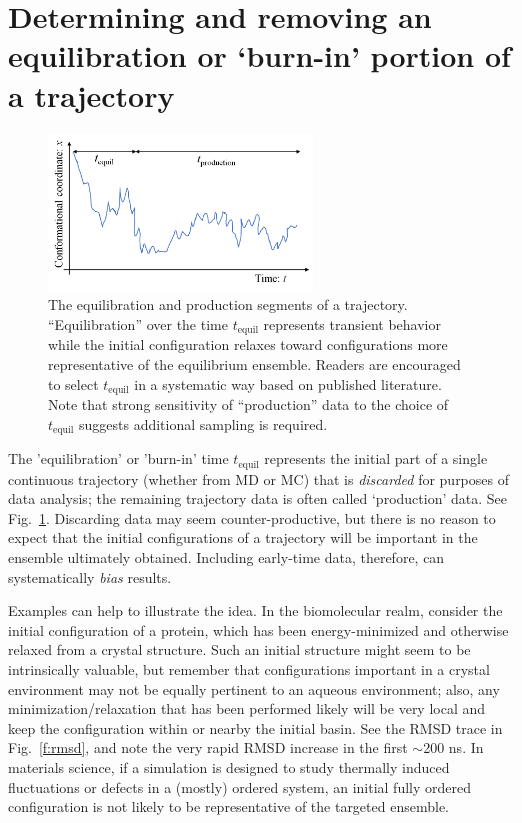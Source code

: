 \section{Determining and removing an equilibration or `burn-in' portion of a trajectory}
\label{sec:equil}

\begin{figure}
  \centering
  \includegraphics[width=7cm]{figures/tequil-time-trace}
  \caption{
  \label{fig:tequil} 
  The equilibration and production segments of a trajectory.
  ``Equilibration'' over the time $t_{\mathrm{equil}}$ represents transient behavior while the initial configuration relaxes toward configurations more representative of the equilibrium ensemble.
  Readers are encouraged to select $t_{\mathrm{equil}}$ in a systematic way based on published literature.
  Note that strong sensitivity of ``production'' data to the choice of $t_{\mathrm{equil}}$ suggests additional sampling is required.
  }
\end{figure}

The 'equilibration' or 'burn-in' time $t_{\mathrm{equil}}$ represents the initial part of a single continuous trajectory (whether from MD or MC) that is \emph{discarded} for purposes of data analysis; 
the remaining trajectory data is often called `production' data.
See Fig.\ \ref{fig:tequil}.
Discarding data may seem counter-productive, but there is no reason to expect that the initial configurations of a trajectory will be important in the ensemble ultimately obtained.
Including early-time data, therefore, can systematically \emph{bias} results.

Examples can help to illustrate the idea.
In the biomolecular realm, consider the initial configuration of a protein, which has been energy-minimized and otherwise relaxed from a crystal structure.
Such an initial structure might seem to be intrinsically valuable, but remember that configurations important in a crystal environment may not be equally pertinent to an aqueous environment;
also, any minimization/relaxation that has been performed likely will be very local and keep the configuration within or nearby the initial basin.
See the RMSD trace in Fig.\ \ref{f:rmsd}, and note the very rapid RMSD increase in the first $\sim$200 ns.
In materials science, if a simulation is designed to study thermally induced fluctuations or defects in a (mostly) ordered system, 
an initial fully ordered configuration is not likely to be representative of the targeted ensemble.

